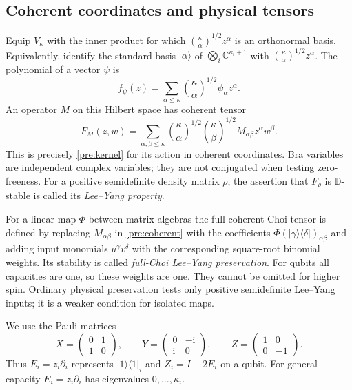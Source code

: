 \documentclass[reqno]{amsart}
\theoremstyle{definition}
\theoremstyle{remark}
\newcommand{\C}{\mathbb C}
\newcommand{\D}{\mathbb D}
\begin{document}
\subsection{Coherent coordinates and physical tensors}
Equip $V_\kappa$ with the inner product for which
$\binom{\kappa}{\alpha}^{1/2}z^\alpha$ is an orthonormal basis.
Equivalently, identify the standard basis $|\alpha\rangle$ of
$\bigotimes_i\C^{\kappa_i+1}$ with
$\binom{\kappa}{\alpha}^{1/2}z^\alpha$. The polynomial of a vector
$\psi$ is
\[
 f_\psi(z)=\sum_{\alpha\leq\kappa}
          \binom{\kappa}{\alpha}^{1/2}\psi_\alpha z^\alpha.
\]
An operator $M$ on this Hilbert space has coherent tensor
\begin{equation}\label{pre:coherent}
 F_M(z,w)=\sum_{\alpha,\beta\leq\kappa}
 \binom{\kappa}{\alpha}^{1/2}\binom{\kappa}{\beta}^{1/2}
 M_{\alpha\beta}z^\alpha w^\beta .
\end{equation}
This is precisely \eqref{pre:kernel} for its action in coherent
coordinates. Bra variables are independent complex variables;
they are not conjugated when testing zero-freeness.
For a positive semidefinite density matrix $\rho$, the assertion
that $F_\rho$ is $\D$-stable is called its \emph{Lee--Yang property}.

For a linear map $\Phi$ between matrix algebras the full coherent
Choi tensor is defined by replacing $M_{\alpha\beta}$ in
\eqref{pre:coherent} with the coefficients
$\Phi(|\gamma\rangle\langle\delta|)_{\alpha\beta}$ and adding
input monomials $u^\gamma v^\delta$ with the corresponding square-root
binomial weights. Its stability is called \emph{full-Choi
Lee--Yang preservation}. For qubits all capacities are one, so
these weights are one. They cannot be omitted for higher spin.
Ordinary physical preservation tests only positive semidefinite
Lee--Yang inputs; it is a weaker condition for isolated maps.

We use the Pauli matrices
\[
 X=\begin{pmatrix}0&1\\1&0\end{pmatrix},\qquad
 Y=\begin{pmatrix}0&-\mathrm i\\\mathrm i&0\end{pmatrix},\qquad
 Z=\begin{pmatrix}1&0\\0&-1\end{pmatrix}.
\]
Thus $E_i=z_i\partial_i$ represents $|1\rangle\langle1|_i$
and $Z_i=I-2E_i$ on a qubit.
For general capacity $E_i=z_i\partial_i$ has eigenvalues
$0,\ldots,\kappa_i$. 
\end{document}
